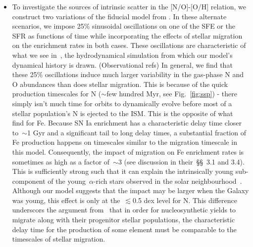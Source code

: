 \documentclass[ms.tex]{subfiles}
\begin{document}
\begin{itemize}
	\item To investigate the sources of intrinsic scatter in the [N/O]-[O/H]
	relation, we construct two variations of the fiducial model from
	\citet{Johnson2021}.
	In these alternate scenarios, we impose 25\% sinusoidal oscillations on one
	of the SFE or the SFR as functions of time while incorporating the effects
	of stellar migration on the enrichment rates in both cases.
	These oscillations are characteristic of what we see in~\hsim, the
	hydrodynamical simulation from which our model's dynamical history is
	drawn.
	{\color{red} (Observational refs)}
	In general, we find that these 25\% oscillations induce much larger
	variability in the gas-phase N and O abundances than does stellar
	migration.
	This is because of the quick production timescales for N ($\sim$few hundred
	Myr, see Fig.~\ref{fig:ssp}) - there simply isn't much time for orbits to
	dynamically evolve before most of a stellar population's N is ejected to
	the ISM.
	This is the opposite of what~\citet{Johnson2021} find for Fe.
	Because SN Ia enrichment has a characteristic delay time closer to~$\sim$1
	Gyr and a significant tail to long delay times, a substantial fraction of
	Fe production happens on timescales similar to the migration timescale in
	this model.
	Consequently, the impact of migration on Fe enrichment rates is sometimes 
	as high as a factor of~$\sim$3 (see discussion in their~\S\S~3.1 and 3.4).
	This is sufficiently strong such that it can explain the intrinsically
	young sub-component of the young~$\alpha$-rich stars observed in the solar
	neighbourhood~\citep{Chiappini2015, Martig2015, Martig2016, Jofre2016,
	Yong2016, Izzard2018, SilvaAguirre2018, Warfield2021}.
	Although our model suggests that the impact may be larger when the Galaxy
	was young, this effect is only at the~$\lesssim$0.5 dex level for N.
	This difference underscors the argument from~\citet{Johnson2021} that in
	order for nucleosynthetic yields to migrate along with their progenitor
	stellar populations, the characteristic delay time for the production of
	some element must be comparable to the timescales of stellar migration.


\end{itemize}
\end{document}
